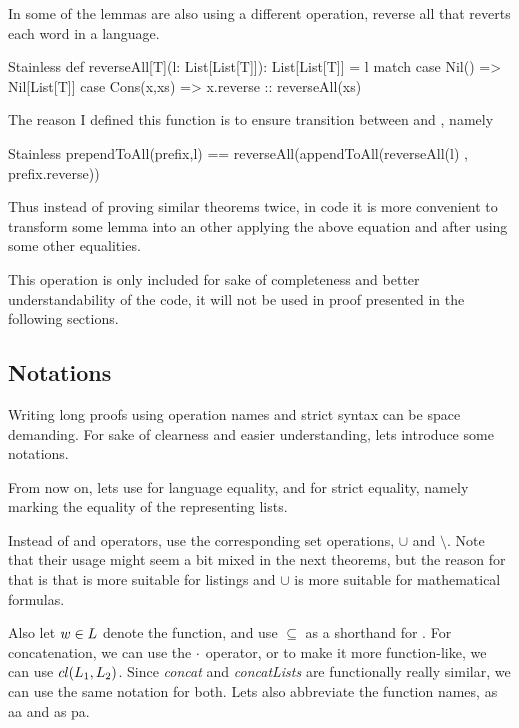 In some of the lemmas are also using a different operation, reverse all that reverts each word in a language.

\begin{ShortCode}{Stainless}
def reverseAll[T](l: List[List[T]]): List[List[T]] ={
  l match {
    case Nil() => Nil[List[T]]
    case Cons(x,xs) => x.reverse :: reverseAll(xs)
  }
}
\end{ShortCode}

The reason I defined this function is to ensure transition between  and , namely

\begin{ShortCode}{Stainless}
prependToAll(prefix,l) == 
  reverseAll(appendToAll(reverseAll(l) , prefix.reverse))
\end{ShortCode}


Thus instead of proving similar theorems twice, in code it is more convenient to transform some lemma into an other applying the above equation and after using some other equalities.

This  operation is only included for sake of completeness and better understandability of the code, it will not be used in proof presented in the following sections.

\subsection{Notations}

Writing long proofs using operation names and strict syntax can be space demanding. For sake of clearness and easier understanding, lets introduce some notations.

From now on, lets use \inline{==} for language equality, and \inline{===} for strict equality, namely marking the equality of the representing lists.

Instead of \inline{++} and \inline{--} operators, use the corresponding set operations, $\cup$ and $\setminus$. Note that their usage might seem a bit mixed in the next theorems, but the reason for that is that \inline{--} is more suitable for listings and $\cup$ is more suitable for mathematical formulas.

Also let $w \in L$ denote the  function, and use $\subseteq$ as a shorthand for . For concatenation, we can use the $\cdot$ operator, or to make it more function-like, we can use $cl(L_{1} , L_{2})$. Since \emph{concat} and \emph{concatLists} are functionally really similar, we can use the same notation for both. Lets also abbreviate the function names,  as aa and  as pa.

